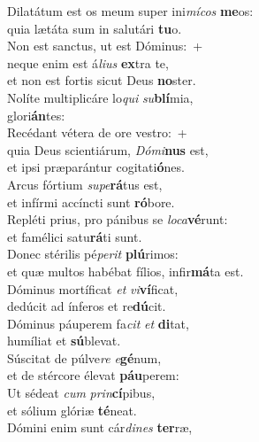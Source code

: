 \evenverse Dilatátum est os meum super ini\textit{mí}\textit{cos} \textbf{me}os:~\*\\
\evenverse quia lætáta sum in salutári \textbf{tu}o.\\
\oddverse Non est sanctus, ut est Dóminus:~+\\
\oddverse  neque enim est á\textit{li}\textit{us} \textbf{ex}tra te,~\*\\
\oddverse et non est fortis sicut Deus \textbf{no}ster.\\
\evenverse Nolíte multiplicáre lo\textit{qui} \textit{su}\textbf{blí}mia,~\*\\
\evenverse glori\textbf{án}tes:\\
\oddverse Recédant vétera de ore vestro:~+\\
\oddverse  quia Deus scientiárum, \textit{Dó}\textit{mi}\textbf{nus} est,~\*\\
\oddverse et ipsi præparántur cogitati\textbf{ó}nes.\\
\evenverse Arcus fórtium \textit{su}\textit{pe}\textbf{rá}tus est,~\*\\
\evenverse et infírmi accíncti sunt \textbf{ró}bore.\\
\oddverse Repléti prius, pro pánibus se \textit{lo}\textit{ca}\textbf{vé}runt:~\*\\
\oddverse et famélici satu\textbf{rá}ti sunt.\\
\evenverse Donec stérilis pé\textit{pe}\textit{rit} \textbf{plú}rimos:~\*\\
\evenverse et quæ multos habébat fílios, infir\textbf{má}ta est.\\
\oddverse Dóminus mortíficat \textit{et} \textit{vi}\textbf{ví}ficat,~\*\\
\oddverse dedúcit ad ínferos et re\textbf{dú}cit.\\
\evenverse Dóminus páuperem fa\textit{cit} \textit{et} \textbf{di}tat,~\*\\
\evenverse humíliat et \textbf{sú}blevat.\\
\oddverse Súscitat de púlve\textit{re} \textit{e}\textbf{gé}num,~\*\\
\oddverse et de stércore élevat \textbf{páu}perem:\\
\evenverse Ut sédeat \textit{cum} \textit{prin}\textbf{cí}pibus,~\*\\
\evenverse et sólium glóriæ \textbf{té}neat.\\
\oddverse Dómini enim sunt cár\textit{di}\textit{nes} \textbf{ter}ræ,~\*\\
